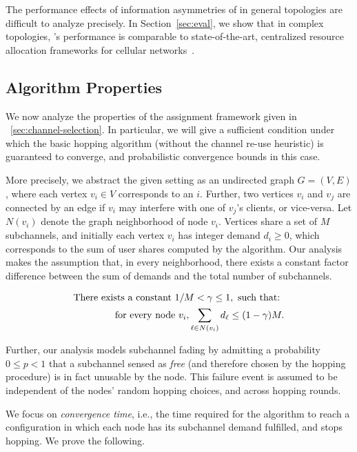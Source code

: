 The performance effects of information asymmetries of \cf in general topologies are difficult to analyze precisely. 
In Section~\ref{sec:eval},
we show that in complex topologies, \cf's performance is comparable to state-of-the-art, centralized resource allocation frameworks for cellular networks~\cite{fermi}.



\subsection{Algorithm Properties}
\label{sec:proof}
We now analyze the properties of the assignment framework given in ~\ref{sec:channel-selection}. 
In particular, we will give a sufficient condition under which the basic hopping algorithm 
(without the channel re-use heuristic) is guaranteed to converge, 
and probabilistic convergence bounds in this case. 

More precisely, we abstract the given setting as an undirected graph $G = (V, E)$, where each vertex $v_i \in V$ corresponds to an \eNB $i$. 
Further, two vertices $v_i$ and $v_j$ are connected by an edge if $v_i$ may interfere with one of $v_j$'s clients, or vice-versa. 
Let $N(v_i)$ denote the graph neighborhood of node $v_i$. 
Vertices share a set of $M$ subchannels, and initially each vertex $v_i$ has integer demand $d_i \geq 0$, which corresponds to the sum of user shares computed by the algorithm. 
Our analysis makes the assumption that, in every neighborhood, there exists a constant factor difference between the sum of demands and the total number of  subchannels.

\begin{eqnarray*}
  \textnormal{There exists a constant } 1 / M < \gamma \leq 1, \textnormal{ such that: } \\ \textnormal{ for every node }  v_i, \sum_{\ell \in N(v_i)} d_\ell \leq (1 - \gamma) M.
\end{eqnarray*}

Further, our analysis models subchannel fading by admitting a probability $0 \leq p < 1$ that a subchannel sensed as \emph{free} (and therefore chosen by the hopping procedure) is in fact unusable by the node. 
This failure event is assumed to be independent of the nodes' random hopping choices, and across hopping rounds. 

We focus on \emph{convergence time}, i.e., the time required for the algorithm to reach a configuration in which each node has its subchannel demand fulfilled, and stops hopping. 
We prove the following. 

